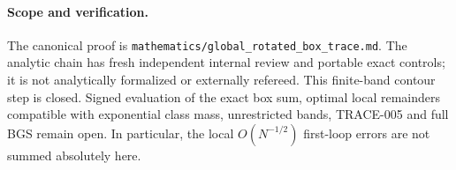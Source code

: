 \paragraph{Scope and verification.}
The canonical proof is \texttt{mathematics/\allowbreak{}global\_\allowbreak{}rotated\_\allowbreak{}box\_\allowbreak{}trace.md}.
The analytic chain has fresh independent internal review and portable exact
controls; it is not analytically formalized or externally refereed.
This finite-band contour step is closed. Signed evaluation of the exact
box sum, optimal local remainders compatible with exponential class mass,
unrestricted bands, TRACE-005 and full BGS remain open. In particular, the
local $O(N^{-1/2})$ first-loop errors are not summed absolutely here.
